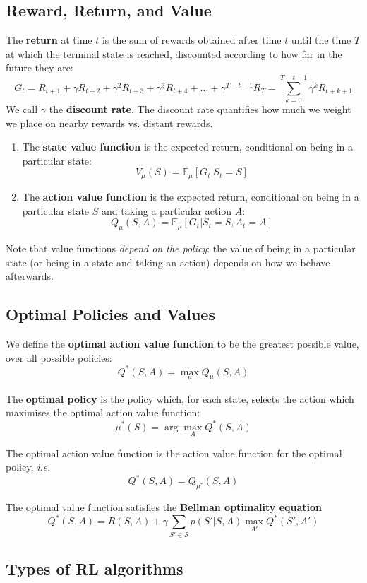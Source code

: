 \documentclass[]{article}
\newcommand{\E}{\mathbb{E}}
\newcommand{\ie}{\emph{i.e.}}
\begin{document}
\subsection*{Reward, Return, and Value}

The \textbf{return} at time $t$ is the sum of rewards obtained after time $t$ until the time $T$ at which the terminal state is reached, discounted according to how far in the future they are:
\[ G_t = R_{t+1} + \gamma R_{t+2} + \gamma^2 R_{t+3} + \gamma^3 R_{t+4} + \dots + \gamma^{T-t-1} R_T = \sum_{k=0}^{T-t-1} \gamma^k R_{t+k+1}  \] 
We call $\gamma$ the \textbf{discount rate}. The discount rate quantifies how much we weight we place on nearby rewards vs. distant rewards. 
\begin{enumerate}
	\item The \textbf{state value function} is the expected return, conditional on being in a particular state: \[ V_\mu(S) = \E_\mu[ G_t | S_t = S] \]
	\item The \textbf{action value function} is the expected return, conditional on being in a particular state $S$ and taking a particular action $A$: \[ Q_\mu(S,A) = \E_\mu[ G_t | S_t = S, A_t = A ] \]
\end{enumerate}
Note that value functions \emph{depend on the policy}: the value of being in a particular state (or being in a state and taking an action) depends on how we behave afterwards. 

\subsection*{Optimal Policies and Values}

We define the \textbf{optimal action value function} to be the greatest possible value, over all possible policies: \[ Q^*(S,A) = \max_\mu Q_\mu(S,A) \]

The \textbf{optimal policy} is the policy which, for each state, selects the action which maximises the optimal action value function: \[ \mu^*(S) = \arg\max_A Q^*(S,A) \]

The optimal action value function is the action value function for the optimal policy, \ie \[ Q^*(S,A) = Q_{\mu^*}(S,A) \] 

The optimal value function satisfies the \textbf{Bellman optimality equation} \[ Q^*(S,A) = R(S,A) + \gamma \sum_{S' \in \mathcal{S}} p(S'|S,A) \max_{A'} Q^*(S',A') \]

\subsection*{Types of RL algorithms}
\end{document}

